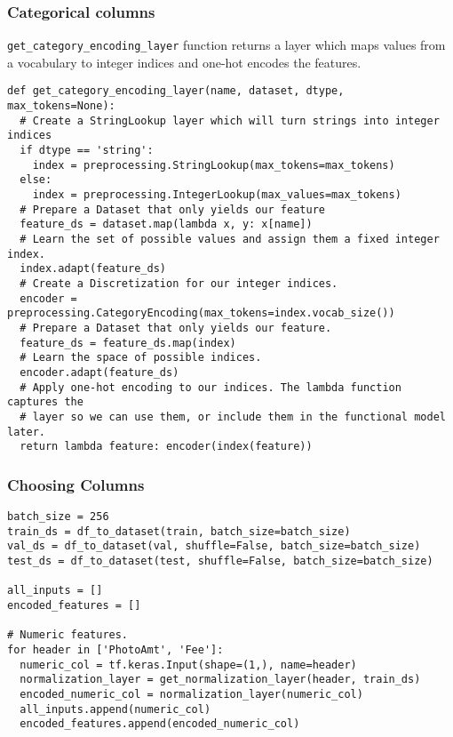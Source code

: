 \begin{frame}[fragile]\frametitle{Categorical columns}
\lstinline|get_category_encoding_layer| function returns a layer which maps values from a vocabulary to integer indices and one-hot encodes the features.

\begin{lstlisting}
def get_category_encoding_layer(name, dataset, dtype, max_tokens=None):
  # Create a StringLookup layer which will turn strings into integer indices
  if dtype == 'string':
    index = preprocessing.StringLookup(max_tokens=max_tokens)
  else:
    index = preprocessing.IntegerLookup(max_values=max_tokens)
  # Prepare a Dataset that only yields our feature
  feature_ds = dataset.map(lambda x, y: x[name])
  # Learn the set of possible values and assign them a fixed integer index.
  index.adapt(feature_ds)
  # Create a Discretization for our integer indices.
  encoder = preprocessing.CategoryEncoding(max_tokens=index.vocab_size())
  # Prepare a Dataset that only yields our feature.
  feature_ds = feature_ds.map(index)
  # Learn the space of possible indices.
  encoder.adapt(feature_ds)
  # Apply one-hot encoding to our indices. The lambda function captures the
  # layer so we can use them, or include them in the functional model later.
  return lambda feature: encoder(index(feature))
\end{lstlisting}

\end{frame}

\begin{frame}[fragile]\frametitle{Choosing Columns}

\begin{lstlisting}
batch_size = 256
train_ds = df_to_dataset(train, batch_size=batch_size)
val_ds = df_to_dataset(val, shuffle=False, batch_size=batch_size)
test_ds = df_to_dataset(test, shuffle=False, batch_size=batch_size)

all_inputs = []
encoded_features = []

# Numeric features.
for header in ['PhotoAmt', 'Fee']:
  numeric_col = tf.keras.Input(shape=(1,), name=header)
  normalization_layer = get_normalization_layer(header, train_ds)
  encoded_numeric_col = normalization_layer(numeric_col)
  all_inputs.append(numeric_col)
  encoded_features.append(encoded_numeric_col)
\end{lstlisting}

\end{frame}



